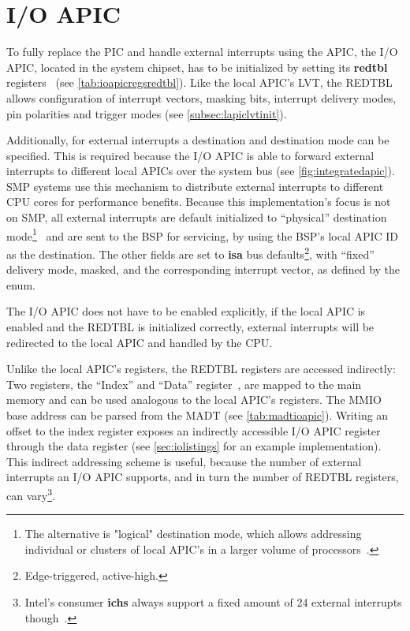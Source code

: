 \section{I/O APIC}
\label{sec:ioapicinit}


To fully replace the PIC and handle external interrupts using the APIC, the I/O APIC, located in
the system chipset, has to be initialized by setting its \textbf{\gls{redtbl}}
registers~\cite[sec.~9.5.8]{ich5} (see \autoref{tab:ioapicregsredtbl}). Like the local APIC's LVT,
the REDTBL allows configuration of interrupt vectors, masking bits, interrupt delivery modes, pin
polarities and trigger modes (see \autoref{subsec:lapiclvtinit}).

Additionally, for external interrupts a destination and destination mode can be specified. This is
required because the I/O APIC is able to forward external interrupts to different local APICs over
the system bus (see \autoref{fig:integratedapic}). SMP systems use this mechanism to distribute
external interrupts to different CPU cores for performance benefits. Because this implementation's
focus is not on SMP, all external interrupts are default initialized to ``physical'' destination
mode\footnote{The alternative is "logical" destination mode, which allows addressing individual or
  clusters of local APIC's in a larger volume of
  processors~\cite[sec.~3.11.6.2.2]{ia32}.}~\cite[sec.~3.11.6.2.1]{ia32} and are sent to the BSP for
servicing, by using the BSP's local APIC ID as the destination. The other fields are set to
\textbf{\gls{isa}} bus defaults\footnote{Edge-triggered, active-high.}, with ``fixed'' delivery
mode, masked, and the corresponding interrupt vector, as defined by the 
enum.

The I/O APIC does not have to be enabled explicitly, if the local APIC is enabled and the REDTBL is
initialized correctly, external interrupts will be redirected to the local APIC and handled by the
CPU\@.

Unlike the local APIC's registers, the REDTBL registers are accessed indirectly: Two registers, the
``Index'' and ``Data'' register~\cite[sec.~9.5.1]{ich5}, are mapped to the main memory and can be
used analogous to the local APIC's registers. The MMIO base address can be parsed from the MADT
(see \autoref{tab:madtioapic}). Writing an offset to the index register exposes an indirectly
accessible I/O APIC register through the data register (see \autoref{sec:iolistings} for an example
implementation). This indirect addressing scheme is useful, because the number of external
interrupts an I/O APIC supports, and in turn the number of REDTBL registers, can
vary\footnote{Intel's consumer \textbf{\glspl{ich}} always support a fixed amount of 24 external
  interrupts though~\cite[sec.~9.5.7]{ich5}.}.

